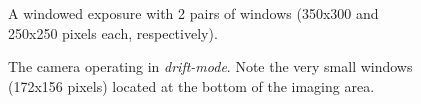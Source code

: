 \begin{figure}  
  \centering
  \setlength{\fboxsep}{0pt}
  \setlength{\fboxrule}{1pt}
  \caption{A windowed exposure with 2 pairs of windows (350x300 and 250x250 pixels each, respectively).}
  \label{fig:V713Cep}
\end{figure}

\begin{figure}  
  \centering
  \setlength{\fboxsep}{0pt}
  \setlength{\fboxrule}{1pt}
  \caption{The camera operating in \emph{drift-mode}. Note the very small windows (172x156 pixels) located at the bottom of the imaging area.}
  \label{fig:V834Cen}
\end{figure}

